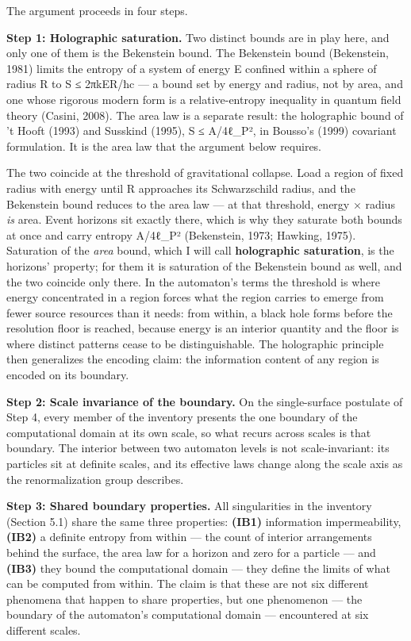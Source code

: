 \documentclass[
]{article}
\begin{document}
The argument proceeds in four steps.

\textbf{Step 1: Holographic saturation.} Two distinct bounds are in play
here, and only one of them is the Bekenstein bound. The Bekenstein bound
(Bekenstein, 1981) limits the entropy of a system of energy E confined
within a sphere of radius R to S ≤ 2πkER/ħc --- a bound set by energy
and radius, not by area, and one whose rigorous modern form is a
relative-entropy inequality in quantum field theory (Casini, 2008). The
area law is a separate result: the holographic bound of 't Hooft (1993)
and Susskind (1995), S ≤ A/4ℓ\_P², in Bousso's (1999) covariant
formulation. It is the area law that the argument below requires.

The two coincide at the threshold of gravitational collapse. Load a
region of fixed radius with energy until R approaches its Schwarzschild
radius, and the Bekenstein bound reduces to the area law --- at that
threshold, energy × radius \emph{is} area. Event horizons sit exactly
there, which is why they saturate both bounds at once and carry entropy
A/4ℓ\_P² (Bekenstein, 1973; Hawking, 1975). Saturation of the
\emph{area} bound, which I will call \textbf{holographic saturation}, is
the horizons' property; for them it is saturation of the Bekenstein
bound as well, and the two coincide only there. In the automaton's terms
the threshold is where energy concentrated in a region forces what the
region carries to emerge from fewer source resources than it needs: from
within, a black hole forms before the resolution floor is reached,
because energy is an interior quantity and the floor is where distinct
patterns cease to be distinguishable. The holographic principle then
generalizes the encoding claim: the information content of any region is
encoded on its boundary.

\textbf{Step 2: Scale invariance of the boundary.} On the single-surface
postulate of Step 4, every member of the inventory presents the one
boundary of the computational domain at its own scale, so what recurs
across scales is that boundary. The interior between two automaton
levels is not scale-invariant: its particles sit at definite scales, and
its effective laws change along the scale axis as the renormalization
group describes.

\textbf{Step 3: Shared boundary properties.} All singularities in the
inventory (Section 5.1) share the same three properties: \textbf{(IB1)}
information impermeability, \textbf{(IB2)} a definite entropy from
within --- the count of interior arrangements behind the surface, the
area law for a horizon and zero for a particle --- and \textbf{(IB3)}
they bound the computational domain --- they define the limits of what
can be computed from within. The claim is that these are not six
different phenomena that happen to share properties, but one phenomenon
--- the boundary of the automaton's computational domain --- encountered
at six different scales.
\end{document}
